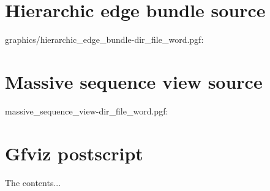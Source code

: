 \documentclass[draft,final]{vutinfth} %
\begin{document}

\tableofcontents %

\listoffigures %



\mainmatter












\begin{appendices}
\chapter{Hierarchic edge bundle source}

graphics/hierarchic\_edge\_bundle-dir\_file\_word.pgf:

% 

\chapter{Massive sequence view source}

massive\_sequence\_view-dir\_file\_word.pgf:

% 

\chapter{Gfviz postscript}

The contents...

\end{appendices}

\backmatter




\printindex

\printglossaries
\end{document}
